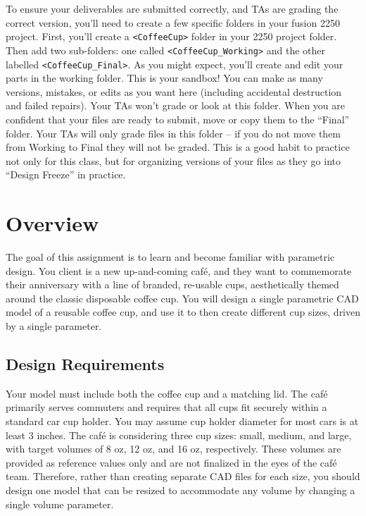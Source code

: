 \documentclass[11pt]{article}
\begin{document}
\MakeHandoutHeader



To ensure your deliverables are submitted correctly, and TAs are grading the correct version, you'll need to create a few specific folders in your fusion 2250 project.
First, you'll create a \texttt{<CoffeeCup>} folder in your 2250 project folder.
Then add two sub-folders: one called \texttt{<CoffeeCup\_Working>} and the other labelled \texttt{<CoffeeCup\_Final>}.
As you might expect, you'll create and edit your parts in the working folder.
This is your sandbox!
You can make as many versions, mistakes, or edits as you want here (including accidental destruction and failed repairs).
Your TAs won't grade or look at this folder.
When you are confident that your files are ready to submit, move or copy them to the “Final” folder.
Your TAs will only grade files in this folder – if you do not move them from Working to Final they will not be graded.
This is a good habit to practice not only for this class, but for organizing versions of your files as they go into “Design Freeze” in practice.

\section{Overview}
The goal of this assignment is to learn and become familiar with parametric design.
You client is a new up-and-coming café, and they want to commemorate their anniversary with a line of branded, re-usable cups, aesthetically themed around the classic disposable coffee cup.
You will design a single parametric CAD model of a reusable coffee cup, and use it to then create different cup sizes, driven by a single parameter.
\subsection*{Design Requirements}
Your model must include both the coffee cup and a matching lid.
The café primarily serves commuters and requires that all cups fit securely within a standard car cup holder.
You may assume cup holder diameter for most cars is at least 3 inches.
The café is considering three cup sizes: small, medium, and large, with target volumes of 8 oz, 12 oz, and 16 oz, respectively.
These volumes are provided as reference values only and are not finalized in the eyes of the café team.
Therefore, rather than creating separate CAD files for each size, you should design one model that can be resized to accommodate any volume by changing a single volume parameter.
\end{document}
